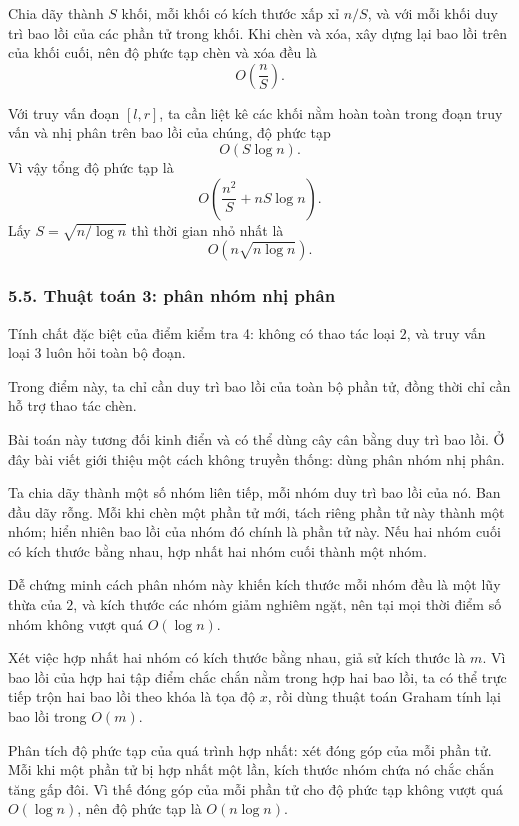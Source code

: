 \documentclass[11pt]{article}
\begin{document}
Chia dãy thành \(S\) khối, mỗi khối có kích thước xấp xỉ \(n/S\), và với mỗi
khối duy trì bao lồi của các phần tử trong khối. Khi chèn và xóa, xây dựng lại
bao lồi trên của khối cuối, nên độ phức tạp chèn và xóa đều là
\[
  O\left(\frac nS\right).
\]

Với truy vấn đoạn \([l,r]\), ta cần liệt kê các khối nằm hoàn toàn trong đoạn
truy vấn và nhị phân trên bao lồi của chúng, độ phức tạp
\[
  O(S\log n).
\]
Vì vậy tổng độ phức tạp là
\[
  O\left(\frac{n^2}{S}+nS\log n\right).
\]
Lấy \(S=\sqrt{n/\log n}\) thì thời gian nhỏ nhất là
\[
  O\left(n\sqrt{n\log n}\right).
\]

\subsubsection*{5.5. Thuật toán 3: phân nhóm nhị phân}

Tính chất đặc biệt của điểm kiểm tra 4: không có thao tác loại \(2\), và truy
vấn loại \(3\) luôn hỏi toàn bộ đoạn.

Trong điểm này, ta chỉ cần duy trì bao lồi của toàn bộ phần tử, đồng thời chỉ
cần hỗ trợ thao tác chèn.

Bài toán này tương đối kinh điển và có thể dùng cây cân bằng duy trì bao lồi.
Ở đây bài viết giới thiệu một cách không truyền thống: dùng phân nhóm nhị
phân.

Ta chia dãy thành một số nhóm liên tiếp, mỗi nhóm duy trì bao lồi của nó. Ban
đầu dãy rỗng. Mỗi khi chèn một phần tử mới, tách riêng phần tử này thành một
nhóm; hiển nhiên bao lồi của nhóm đó chính là phần tử này. Nếu hai nhóm cuối
có kích thước bằng nhau, hợp nhất hai nhóm cuối thành một nhóm.

Dễ chứng minh cách phân nhóm này khiến kích thước mỗi nhóm đều là một lũy
thừa của \(2\), và kích thước các nhóm giảm nghiêm ngặt, nên tại mọi thời điểm
số nhóm không vượt quá \(O(\log n)\).

Xét việc hợp nhất hai nhóm có kích thước bằng nhau, giả sử kích thước là
\(m\). Vì bao lồi của hợp hai tập điểm chắc chắn nằm trong hợp hai bao lồi, ta
có thể trực tiếp trộn hai bao lồi theo khóa là tọa độ \(x\), rồi dùng thuật
toán Graham tính lại bao lồi trong \(O(m)\).

Phân tích độ phức tạp của quá trình hợp nhất: xét đóng góp của mỗi phần tử.
Mỗi khi một phần tử bị hợp nhất một lần, kích thước nhóm chứa nó chắc chắn
tăng gấp đôi. Vì thế đóng góp của mỗi phần tử cho độ phức tạp không vượt quá
\(O(\log n)\), nên độ phức tạp là \(O(n\log n)\).
\end{document}
